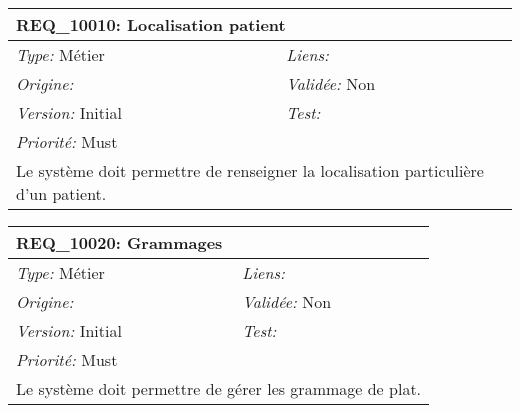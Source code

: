\begin{table}[!h]

\begin{tabular}{|p{60mm}p{100mm}|}

\hline

\multicolumn{2}{|l|}{\textbf{REQ\_10010:} Localisation patient} \\ \hline

\emph{Type:} Métier & \emph{Liens:}  \\

\emph{Origine:}  & \emph{Validée:} Non \\

\emph{Version:} Initial & \emph{Test:}  \\

\emph{Priorité:} Must & \\ \hline

\multicolumn{2}{|p{16cm}|}{Le système doit permettre de renseigner la localisation particulière d'un patient.} \\ \hline

\end{tabular}

\end{table}



\begin{table}[!h]

\begin{tabular}{|p{60mm}p{100mm}|}

\hline

\multicolumn{2}{|l|}{\textbf{REQ\_10020:} Grammages} \\ \hline

\emph{Type:} Métier & \emph{Liens:}  \\

\emph{Origine:}  & \emph{Validée:} Non \\

\emph{Version:} Initial & \emph{Test:}  \\

\emph{Priorité:} Must & \\ \hline

\multicolumn{2}{|p{16cm}|}{Le système doit permettre de gérer les grammage de plat.} \\ \hline

\end{tabular}

\end{table}



